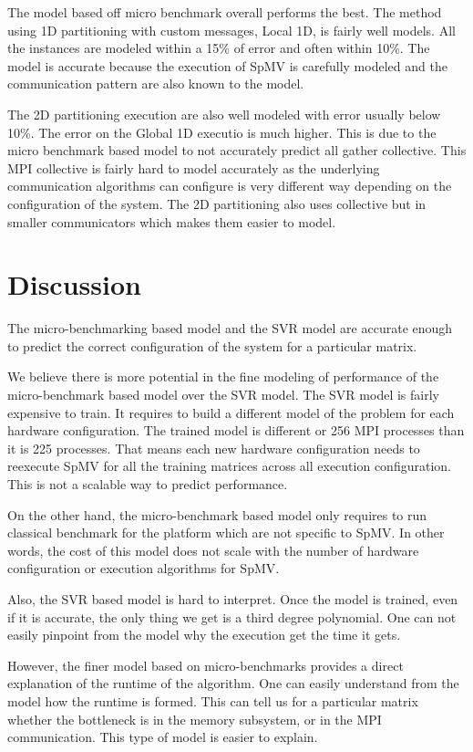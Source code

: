 \documentclass[sigconf,review,anonymous]{acmart}
\begin{document}
The model based off micro benchmark overall performs the best. The
method using 1D partitioning with custom messages, Local 1D, is fairly
well models. All the instances are modeled within a 15\% of error and
often within 10\%. The model is accurate because the execution of SpMV
is carefully modeled and the communication pattern are also known to
the model.

The 2D partitioning execution are also well modeled with error usually
below 10\%. The error on the Global 1D executio is much higher. This
is due to the micro benchmark based model to not accurately predict
all gather collective. This MPI collective is fairly hard to model
accurately as the underlying communication algorithms can configure is
very different way depending on the configuration of the system. The
2D partitioning also uses collective but in smaller communicators
which makes them easier to model.



\section{Discussion}

The micro-benchmarking based model and the SVR model are accurate
enough to predict the correct configuration of the system for a
particular matrix.

We believe there is more potential in the fine modeling of performance
of the micro-benchmark based model over the SVR model. The SVR model
is fairly expensive to train. It requires to build a different model
of the problem for each hardware configuration. The trained model is
different or 256 MPI processes than it is 225 processes. That means
each new hardware configuration needs to reexecute SpMV for all the
training matrices across all execution configuration. This is not a
scalable way to predict performance.

On the other hand, the micro-benchmark based model only requires to
run classical benchmark for the platform which are not specific to
SpMV. In other words, the cost of this model does not scale with the
number of hardware configuration or execution algorithms for SpMV.

Also, the SVR based model is hard to interpret. Once the model is
trained, even if it is accurate, the only thing we get is a third
degree polynomial. One can not easily pinpoint from the model why the
execution get the time it gets.

However, the finer model based on micro-benchmarks provides a direct
explanation of the runtime of the algorithm. One can easily understand
from the model how the runtime is formed. This can tell us for a
particular matrix whether the bottleneck is in the memory subsystem,
or in the MPI communication. This type of model is easier to explain.
\end{document}
